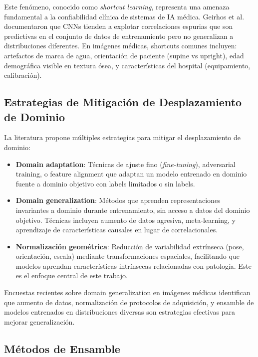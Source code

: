 Este fenómeno, conocido como \textit{shortcut learning}, representa una amenaza fundamental a la confiabilidad clínica de sistemas de IA médica. Geirhos et al. \cite{geirhos2020shortcut} documentaron que CNNs tienden a explotar correlaciones espurias que son predictivas en el conjunto de datos de entrenamiento pero no generalizan a distribuciones diferentes. En imágenes médicas, shortcuts comunes incluyen: artefactos de marca de agua, orientación de paciente (supine vs upright), edad demográfica visible en textura ósea, y características del hospital (equipamiento, calibración).

\subsection{Estrategias de Mitigación de Desplazamiento de Dominio}

La literatura propone múltiples estrategias para mitigar el desplazamiento de dominio:

\begin{itemize}
\item \textbf{Domain adaptation}: Técnicas de ajuste fino (\textit{fine-tuning}), adversarial training, o feature alignment que adaptan un modelo entrenado en dominio fuente a dominio objetivo con labels limitados o sin labels.

\item \textbf{Domain generalization}: Métodos que aprenden representaciones invariantes a dominio durante entrenamiento, sin acceso a datos del dominio objetivo. Técnicas incluyen aumento de datos agresiva, meta-learning, y aprendizaje de características causales en lugar de correlacionales.

\item \textbf{Normalización geométrica}: Reducción de variabilidad extrínseca (pose, orientación, escala) mediante transformaciones espaciales, facilitando que modelos aprendan características intrínsecas relacionadas con patología. Este es el enfoque central de este trabajo.
\end{itemize}

Encuestas recientes sobre domain generalization en imágenes médicas identifican que aumento de datos, normalización de protocolos de adquisición, y ensamble de modelos entrenados en distribuciones diversas son estrategias efectivas para mejorar generalización.

\subsection{Métodos de Ensamble}

